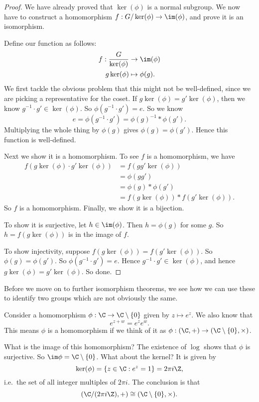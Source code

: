\documentclass[a4paper]{article}
\begin{document}
\begin{proof}
  We have already proved that $\ker (\phi)$ is a normal subgroup. We now have to construct a homomorphism $f : G/\ker(\phi) \to \im (\phi)$, and prove it is an isomorphism.

  Define our function as follows:
  \begin{align*}
    f: \frac{G}{\ker (\phi)} &\to \im (\phi)\\
    g\ker (\phi) &\mapsto \phi(g).
  \end{align*}
  We first tackle the obvious problem that this might not be well-defined, since we are picking a representative for the coset. If $g \ker(\phi) = g' \ker(\phi)$, then we know $g^{-1} \cdot g' \in \ker(\phi)$. So $\phi(g^{-1} \cdot g') = e$. So we know
  \[
    e = \phi(g^{-1} \cdot g') = \phi(g)^{-1} * \phi(g').
  \]
  Multiplying the whole thing by $\phi(g)$ gives $\phi(g) = \phi(g')$. Hence this function is well-defined.

  Next we show it is a homomorphism. To see $f$ is a homomorphism, we have
  \begin{align*}
    f(g\ker (\phi) \cdot g'\ker(\phi)) &= f(gg'\ker(\phi)) \\
    &= \phi(gg') \\
    &= \phi(g) * \phi(g') \\
    &= f(g\ker(\phi)) * f(g'\ker(\phi)).
  \end{align*}
  So $f$ is a homomorphism. Finally, we show it is a bijection.

  To show it is surjective, let $h \in \im (\phi)$. Then $h = \phi(g)$ for some $g$. So $h = f(g\ker (\phi))$ is in the image of $f$.

  To show injectivity, suppose $f(g\ker (\phi)) = f(g'\ker(\phi))$. So $\phi(g) = \phi(g')$. So $\phi(g^{-1} \cdot g') = e$. Hence $g^{-1} \cdot g' \in \ker(\phi)$, and hence $g \ker(\phi) = g'\ker(\phi)$. So done.
\end{proof}

Before we move on to further isomorphism theorems, we see how we can use these to identify two groups which are not obviously the same.

\begin{eg}
  Consider a homomorphism $\phi: \C \to \C\setminus \{0\}$ given by $z \mapsto e^z$. We also know that
  \[
    e^{z + w} = e^z e^w.
  \]
  This means $\phi$ is a homomorphism if we think of it as $\phi: (\C, +) \to (\C\setminus \{0\}, \times)$.

  What is the image of this homomorphism? The existence of $\log$ shows that $\phi$ is surjective. So $\im \phi = \C\setminus \{0\}$. What about the kernel? It is given by
  \[
    \ker(\phi) = \{z \in \C: e^z = 1\} = 2\pi i \Z,
  \]
  i.e.\ the set of all integer multiples of $2\pi i$. The conclusion is that
  \[
    (\C / (2\pi i \Z), +) \cong (\C\setminus \{0\}, \times).
  \]
\end{eg}
\end{document}
